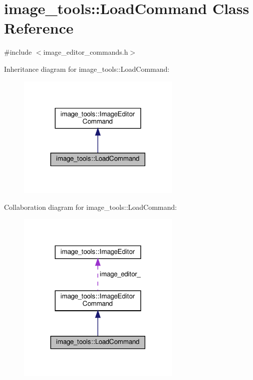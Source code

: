 \hypertarget{classimage__tools_1_1LoadCommand}{}\section{image\+\_\+tools\+:\+:Load\+Command Class Reference}
\label{classimage__tools_1_1LoadCommand}


{\ttfamily \#include $<$image\+\_\+editor\+\_\+commands.\+h$>$}



Inheritance diagram for image\+\_\+tools\+:\+:Load\+Command\+:
\nopagebreak
\begin{figure}[H]
\begin{center}
\leavevmode
\includegraphics[width=221pt]{classimage__tools_1_1LoadCommand__inherit__graph}
\end{center}
\end{figure}


Collaboration diagram for image\+\_\+tools\+:\+:Load\+Command\+:
\nopagebreak
\begin{figure}[H]
\begin{center}
\leavevmode
\includegraphics[width=221pt]{classimage__tools_1_1LoadCommand__coll__graph}
\end{center}
\end{figure}
